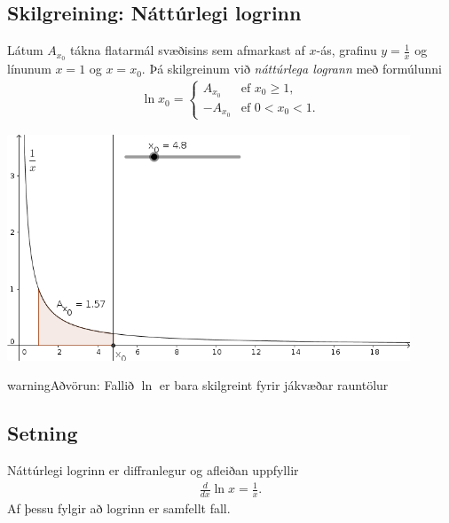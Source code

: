 \documentclass[a4paper,10pt,icelandic]{sphinxmanual}
\begin{document}
\subsection{Skilgreining: Náttúrlegi logrinn}
\label{kafli04:index-0}\label{kafli04:skilgreining-natturlegi-logrinn}
Látum \(A_{x_0}\) tákna flatarmál svæðisins sem afmarkast af
\(x\)-ás, grafinu \(y=\frac{1}{x}\) og línunum \(x=1\) og
\(x=x_0\). Þá skilgreinum við \textit{náttúrlega logrann} með formúlunni
\begin{equation*}
\begin{split}\ln x_0 =\left\{\begin{array}{ll}
A_{x_0} & \mbox{ef }x_0 \geq 1,\\
-A_{x_0} & \mbox{ef }0<x_0<1.
\end{array}
\right.\end{split}
\end{equation*}

\begin{center}
\includegraphics[width=12cm,keepaspectratio=true]{01_ln.png}
\end{center}


\begin{notice}{warning}{Aðvörun:}
Fallið \(\ln\) er bara skilgreint fyrir jákvæðar rauntölur
\end{notice}


\subsection{Setning}
\label{kafli04:setning}
Náttúrlegi logrinn er diffranlegur og afleiðan uppfyllir
\begin{equation*}
\begin{split}\frac{d}{dx}\ln x=\frac{1}{x}.\end{split}
\end{equation*}
Af þessu fylgir að logrinn er samfellt fall.
\end{document}
